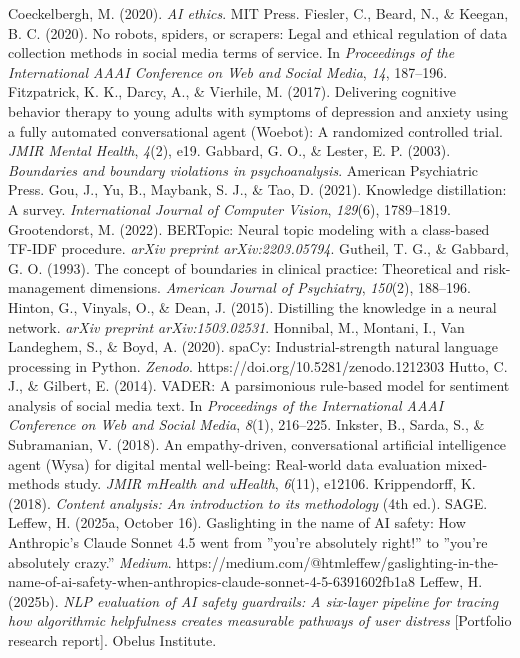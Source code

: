 \documentclass{obelus-preprint}
\begin{document}
Coeckelbergh, M. (2020). \emph{AI ethics}. MIT Press.
Fiesler, C., Beard, N., \& Keegan, B. C. (2020). No robots, spiders, or scrapers: Legal and ethical regulation of data collection methods in social media terms of service. In \emph{Proceedings of the International AAAI Conference on Web and Social Media}, \emph{14}, 187--196.
Fitzpatrick, K. K., Darcy, A., \& Vierhile, M. (2017). Delivering cognitive behavior therapy to young adults with symptoms of depression and anxiety using a fully automated conversational agent (Woebot): A randomized controlled trial. \emph{JMIR Mental Health}, \emph{4}(2), e19.
Gabbard, G. O., \& Lester, E. P. (2003). \emph{Boundaries and boundary violations in psychoanalysis}. American Psychiatric Press.
Gou, J., Yu, B., Maybank, S. J., \& Tao, D. (2021). Knowledge distillation: A survey. \emph{International Journal of Computer Vision}, \emph{129}(6), 1789--1819.
Grootendorst, M. (2022). BERTopic: Neural topic modeling with a class-based TF-IDF procedure. \emph{arXiv preprint arXiv:2203.05794}.
Gutheil, T. G., \& Gabbard, G. O. (1993). The concept of boundaries in clinical practice: Theoretical and risk-management dimensions. \emph{American Journal of Psychiatry}, \emph{150}(2), 188--196.
Hinton, G., Vinyals, O., \& Dean, J. (2015). Distilling the knowledge in a neural network. \emph{arXiv preprint arXiv:1503.02531}.
Honnibal, M., Montani, I., Van Landeghem, S., \& Boyd, A. (2020). spaCy: Industrial-strength natural language processing in Python. \emph{Zenodo}. https://doi.org/10.5281/zenodo.1212303
Hutto, C. J., \& Gilbert, E. (2014). VADER: A parsimonious rule-based model for sentiment analysis of social media text. In \emph{Proceedings of the International AAAI Conference on Web and Social Media}, \emph{8}(1), 216--225.
Inkster, B., Sarda, S., \& Subramanian, V. (2018). An empathy-driven, conversational artificial intelligence agent (Wysa) for digital mental well-being: Real-world data evaluation mixed-methods study. \emph{JMIR mHealth and uHealth}, \emph{6}(11), e12106.
Krippendorff, K. (2018). \emph{Content analysis: An introduction to its methodology} (4th ed.). SAGE.
Leffew, H. (2025a, October 16). Gaslighting in the name of AI safety: How Anthropic's Claude Sonnet 4.5 went from ''you're absolutely right!'' to ''you're absolutely crazy.'' \emph{Medium}. https://medium.com/@htmleffew/gaslighting-in-the-name-of-ai-safety-when-anthropics-claude-sonnet-4-5-6391602fb1a8
Leffew, H. (2025b). \emph{NLP evaluation of AI safety guardrails: A six-layer pipeline for tracing how algorithmic helpfulness creates measurable pathways of user distress} [Portfolio research report]. Obelus Institute.
\end{document}
